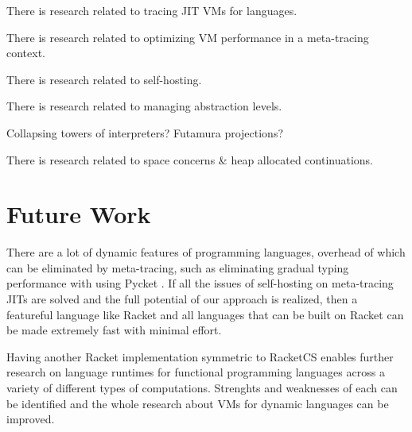         \begin{paragraph-here}%
            There is research related to tracing JIT VMs for languages.
        \end{paragraph-here}

        \begin{paragraph-here}%
            There is research related to optimizing VM performance in a meta-tracing context.
        \end{paragraph-here}

        \begin{paragraph-here}%
            There is research related to self-hosting.
        \end{paragraph-here}

        \begin{paragraph-here}%
            There is research related to managing abstraction levels.

            Collapsing towers of interpreters? Futamura projections?
        \end{paragraph-here}

        \begin{paragraph-here}%
            There is research related to space concerns \& heap allocated continuations.
        \end{paragraph-here}

    \section[\texorpdfstring{Future Work}{Future Work}]{Future Work}

        \begin{paragraph-here}%
            There are a lot of dynamic features of programming languages, overhead of which can be eliminated by meta-tracing, such as eliminating gradual typing performance with using Pycket \cite{pycketmain2}. If all the issues of self-hosting on meta-tracing JITs are solved and the full potential of our approach is realized, then a featureful language like Racket and all languages that can be built on Racket can be made extremely fast with minimal effort.
        \end{paragraph-here}

        \begin{paragraph-here}%
            Having another Racket implementation symmetric to RacketCS enables further research on language runtimes for functional programming languages across a variety of different types of computations. Strenghts and weaknesses of each can be identified and the whole research about VMs for dynamic languages can be improved.
        \end{paragraph-here}

